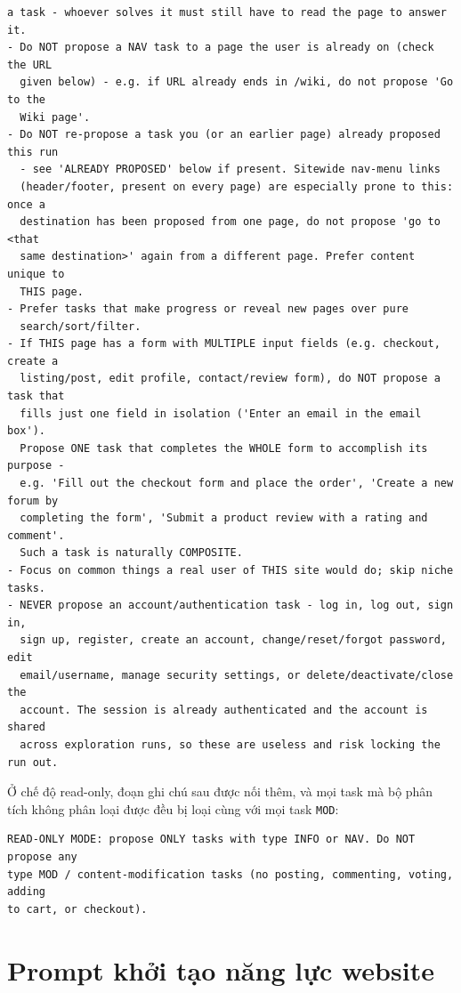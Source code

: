 \begin{lstlisting}[style=mystyle,numbers=none,basicstyle=\scriptsize\ttfamily]
  a task - whoever solves it must still have to read the page to answer it.
- Do NOT propose a NAV task to a page the user is already on (check the URL
  given below) - e.g. if URL already ends in /wiki, do not propose 'Go to the
  Wiki page'.
- Do NOT re-propose a task you (or an earlier page) already proposed this run
  - see 'ALREADY PROPOSED' below if present. Sitewide nav-menu links
  (header/footer, present on every page) are especially prone to this: once a
  destination has been proposed from one page, do not propose 'go to <that
  same destination>' again from a different page. Prefer content unique to
  THIS page.
- Prefer tasks that make progress or reveal new pages over pure
  search/sort/filter.
- If THIS page has a form with MULTIPLE input fields (e.g. checkout, create a
  listing/post, edit profile, contact/review form), do NOT propose a task that
  fills just one field in isolation ('Enter an email in the email box').
  Propose ONE task that completes the WHOLE form to accomplish its purpose -
  e.g. 'Fill out the checkout form and place the order', 'Create a new forum by
  completing the form', 'Submit a product review with a rating and comment'.
  Such a task is naturally COMPOSITE.
- Focus on common things a real user of THIS site would do; skip niche tasks.
- NEVER propose an account/authentication task - log in, log out, sign in,
  sign up, register, create an account, change/reset/forgot password, edit
  email/username, manage security settings, or delete/deactivate/close the
  account. The session is already authenticated and the account is shared
  across exploration runs, so these are useless and risk locking the run out.
\end{lstlisting}

\noindent
Ở chế độ read-only, đoạn ghi chú sau được nối thêm, và mọi task mà bộ phân tích
không phân loại được đều bị loại cùng với mọi task \texttt{MOD}:

\begin{lstlisting}[style=mystyle,numbers=none,basicstyle=\scriptsize\ttfamily]
READ-ONLY MODE: propose ONLY tasks with type INFO or NAV. Do NOT propose any
type MOD / content-modification tasks (no posting, commenting, voting, adding
to cart, or checkout).
\end{lstlisting}

\section{Prompt khởi tạo năng lực website}
\label{app:prompt-seeder}

